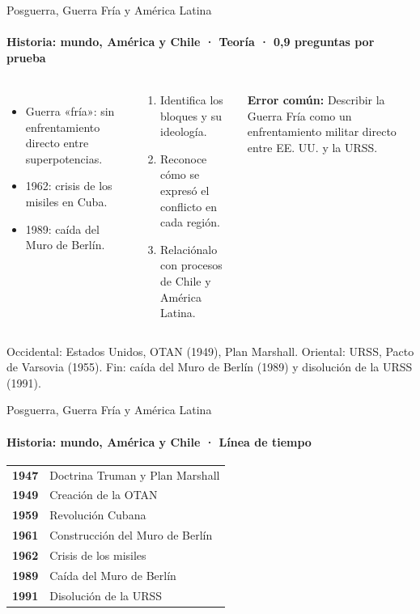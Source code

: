 \documentclass[aspectratio=169,11pt]{beamer}
\makeatletter
\newenvironment{lineatiempo}
  {\footnotesize\renewcommand{\arraystretch}{1.15}\begin{tabular}{@{}>{\leavevmode\bfseries\color{zinc700}}p{0.14\textwidth}p{0.74\textwidth}@{}}}
  {\end{tabular}}
\newlength{\ajustealto}
\newenvironment{ajustar}[1][0.74\textheight]
  {\setlength{\ajustealto}{#1}\begin{lrbox}{\ajustecaja}\begin{minipage}{\textwidth}}
  {\end{minipage}\end{lrbox}%
   \ifdim\dimexpr\ht\ajustecaja+\dp\ajustecaja\relax>\ajustealto
     \resizebox*{!}{\ajustealto}{\usebox{\ajustecaja}}\else\usebox{\ajustecaja}\fi}
\makeatother
\begin{document}
\begin{frame}{Posguerra, Guerra Fría y América Latina}
\label{tema-hi-guerra-fria}
\framesubtitle{Historia: mundo, América y Chile · Teoría · 0,9 preguntas por prueba}
\begin{ajustar}
\begin{columns}[T,onlytextwidth]
\begin{itemize}\footnotesize
\item Guerra «fría»: sin enfrentamiento directo entre superpotencias.
\item 1962: crisis de los misiles en Cuba.
\item 1989: caída del Muro de Berlín.
\end{itemize}
\begin{cajaregla}\scriptsize \begin{enumerate}\item Identifica los bloques y su ideología.\item Reconoce cómo se expresó el conflicto en cada región.\item Relaciónalo con procesos de Chile y América Latina.\end{enumerate}\end{cajaregla}
\begin{notagris}\scriptsize \textbf{Error común:} Describir la Guerra Fría como un enfrentamiento militar directo entre EE. UU. y la URSS.\end{notagris}
\end{columns}
\begin{cajaclave}[Bloques]\footnotesize
Occidental: Estados Unidos, OTAN (1949), Plan Marshall. Oriental: URSS, Pacto de Varsovia (1955). Fin: caída del Muro de Berlín (1989) y disolución de la URSS (1991).
\end{cajaclave}
\end{ajustar}
\end{frame}

\begin{frame}{Posguerra, Guerra Fría y América Latina}
\framesubtitle{Historia: mundo, América y Chile · Línea de tiempo}
\begin{lineatiempo}
1947 & Doctrina Truman y Plan Marshall \\
1949 & Creación de la OTAN \\
1959 & Revolución Cubana \\
1961 & Construcción del Muro de Berlín \\
1962 & Crisis de los misiles \\
1989 & Caída del Muro de Berlín \\
1991 & Disolución de la URSS \\
\end{lineatiempo}
\end{frame}
\end{document}
